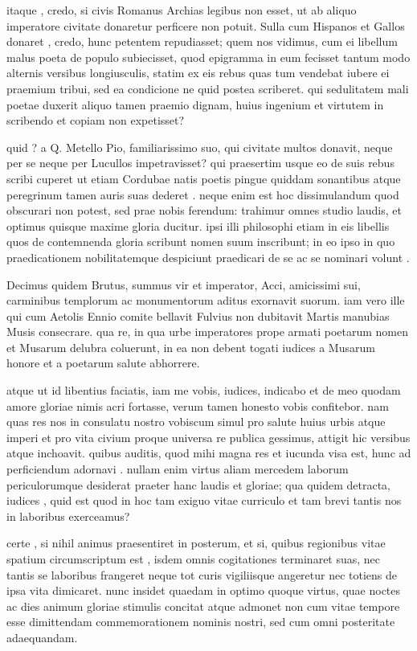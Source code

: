  itaque , credo, si civis Romanus Archias legibus non esset, ut ab aliquo imperatore civitate donaretur perficere non potuit. Sulla cum Hispanos et Gallos donaret , credo, hunc petentem repudiasset; quem nos vidimus, cum ei libellum malus poeta de populo subiecisset, quod epigramma in eum fecisset tantum modo alternis versibus longiusculis, statim ex eis rebus quas tum vendebat iubere ei praemium tribui, sed ea condicione ne quid postea scriberet. qui sedulitatem mali poetae duxerit aliquo tamen praemio dignam, huius ingenium et virtutem in scribendo et copiam non expetisset?

 quid ? a Q. Metello Pio, familiarissimo suo, qui civitate multos donavit, neque per se neque per Lucullos impetravisset? qui praesertim usque eo de suis rebus scribi cuperet ut etiam Cordubae natis poetis pingue quiddam sonantibus atque peregrinum tamen auris suas dederet . neque enim est hoc dissimulandum quod obscurari non potest, sed prae nobis ferendum: trahimur omnes studio laudis, et optimus quisque maxime gloria ducitur. ipsi illi philosophi etiam in eis libellis quos de contemnenda gloria scribunt nomen suum inscribunt; in eo ipso in quo praedicationem nobilitatemque despiciunt praedicari de se ac se nominari volunt .

 Decimus quidem Brutus, summus vir et imperator, Acci, amicissimi sui, carminibus templorum ac monumentorum aditus exornavit suorum. iam vero ille qui cum Aetolis Ennio comite bellavit Fulvius non dubitavit Martis manubias Musis consecrare. qua re, in qua urbe imperatores prope armati poetarum nomen et Musarum delubra coluerunt, in ea non debent togati iudices a Musarum honore et a poetarum salute abhorrere.

 atque ut id libentius faciatis, iam me vobis, iudices, indicabo et de meo quodam amore gloriae nimis acri fortasse, verum tamen honesto vobis confitebor. nam quas res nos in consulatu nostro vobiscum simul pro salute huius urbis atque imperi et pro vita civium proque universa re publica gessimus, attigit hic versibus atque inchoavit. quibus auditis, quod mihi magna res et iucunda visa est, hunc ad perficiendum adornavi . nullam enim virtus aliam mercedem laborum periculorumque desiderat praeter hanc laudis et gloriae; qua quidem detracta, iudices , quid est quod in hoc tam exiguo vitae curriculo et tam brevi tantis nos in laboribus exerceamus?

 certe , si nihil animus praesentiret in posterum, et si, quibus regionibus vitae spatium circumscriptum est , isdem omnis cogitationes terminaret suas, nec tantis se laboribus frangeret neque tot curis vigiliisque angeretur nec totiens de ipsa vita dimicaret. nunc insidet quaedam in optimo quoque virtus, quae noctes ac dies animum gloriae stimulis concitat atque admonet non cum vitae tempore esse dimittendam commemorationem nominis nostri, sed cum omni posteritate adaequandam.

